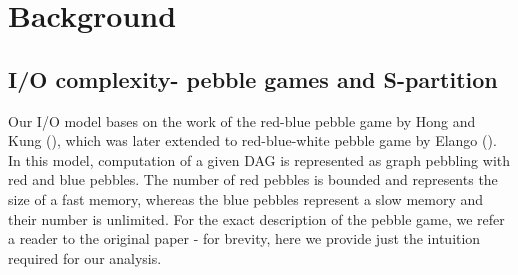 \documentclass[sigconf]{acmart}
\begin{document}
%	
%	
%	
%	
%	
%	
	\section{Background}
	\subsection{I/O complexity- pebble games and S-partition}
	\label{sec:background}
	Our I/O model bases on the work of the red-blue pebble game by Hong and 
	Kung 
	(\cite{redblue}), which was later extended to red-blue-white pebble game by 
	Elango (\cite{redbluewhite}). In this model, computation of a given DAG is 
	represented as graph 
	pebbling with red and blue pebbles. The number of red pebbles is 
	bounded and represents the size of a fast memory, whereas the blue pebbles 
	represent a slow memory and their number is unlimited. For the exact 
	description of the pebble game, we refer a reader to the original paper - 
	for brevity, here we provide just the intuition required for our analysis.
	 
\end{document}
